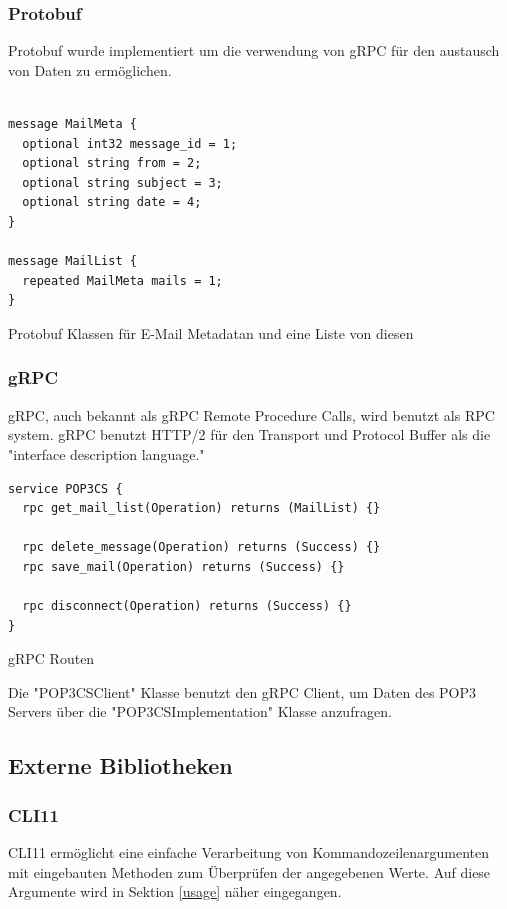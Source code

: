 \documentclass[12pt, letterpaper]{article}
\newenvironment{code}{\captionsetup{type=listing}}{}
\begin{document}
\subsubsection{Protobuf}
Protobuf\cite{protobuf} wurde implementiert um die verwendung von gRPC für den austausch von Daten zu ermöglichen.
\begin{code}
  \begin{verbatim}

message MailMeta {
  optional int32 message_id = 1;
  optional string from = 2;
  optional string subject = 3;
  optional string date = 4;
}

message MailList {
  repeated MailMeta mails = 1;
}

  \end{verbatim}
  \caption{Protobuf Klassen für E-Mail Metadatan und eine Liste von diesen}
\end{code}

\subsubsection{gRPC}

gRPC\cite{grpc}, auch bekannt als gRPC Remote Procedure Calls, wird benutzt als RPC system. gRPC benutzt HTTP/2 für den Transport und Protocol Buffer als die "interface description language."
\begin{code}
  \begin{verbatim}
service POP3CS {
  rpc get_mail_list(Operation) returns (MailList) {}

  rpc delete_message(Operation) returns (Success) {}
  rpc save_mail(Operation) returns (Success) {}

  rpc disconnect(Operation) returns (Success) {}
}
  \end{verbatim}
  \caption{gRPC Routen}
\end{code}

Die "POP3CSClient" Klasse benutzt den gRPC Client, um Daten des POP3 Servers über die "POP3CSImplementation" Klasse anzufragen.

\subsection{Externe Bibliotheken}
\label{extBib}

\subsubsection{CLI11}
CLI11\cite{cli11_ref} ermöglicht eine einfache Verarbeitung von Kommandozeilenargumenten mit eingebauten Methoden zum Überprüfen der angegebenen Werte. Auf diese Argumente wird in Sektion \ref{usage} näher eingegangen.
\end{document}

